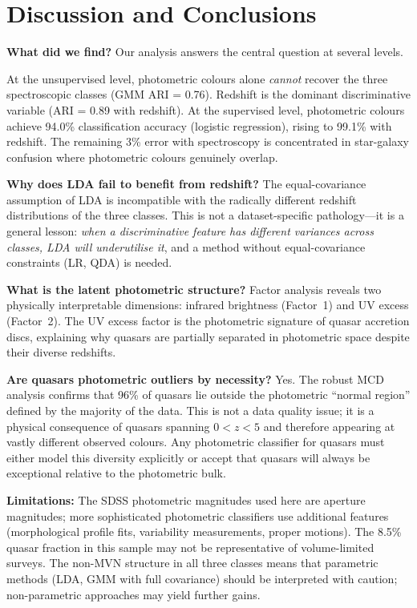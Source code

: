 \documentclass[12pt]{article}
\begin{document}
\section{Discussion and Conclusions}

\textbf{What did we find?} Our analysis answers the central question at several levels.

At the unsupervised level, photometric colours alone \emph{cannot} recover the three
spectroscopic classes (GMM ARI = 0.76). Redshift is the dominant discriminative variable
(ARI = 0.89 with redshift). At the supervised level, photometric colours achieve 94.0\%
classification accuracy (logistic regression), rising to 99.1\% with redshift. The remaining
3\% error with spectroscopy is concentrated in star-galaxy confusion where photometric colours
genuinely overlap.

\textbf{Why does LDA fail to benefit from redshift?} The equal-covariance assumption of LDA
is incompatible with the radically different redshift distributions of the three classes. This is
not a dataset-specific pathology---it is a general lesson: \emph{when a discriminative feature
has different variances across classes, LDA will underutilise it}, and a method without
equal-covariance constraints (LR, QDA) is needed.

\textbf{What is the latent photometric structure?} Factor analysis reveals two physically
interpretable dimensions: infrared brightness (Factor~1) and UV excess (Factor~2). The UV
excess factor is the photometric signature of quasar accretion discs, explaining why quasars
are partially separated in photometric space despite their diverse redshifts.

\textbf{Are quasars photometric outliers by necessity?} Yes. The robust MCD analysis confirms
that 96\% of quasars lie outside the photometric ``normal region'' defined by the
majority of the data. This is not a data quality issue; it is a physical consequence of quasars
spanning $0 < z < 5$ and therefore appearing at vastly different observed colours. Any
photometric classifier for quasars must either model this diversity explicitly or accept that
quasars will always be exceptional relative to the photometric bulk.

\textbf{Limitations:} The SDSS photometric magnitudes used here are aperture magnitudes;
more sophisticated photometric classifiers use additional features (morphological profile fits,
variability measurements, proper motions). The 8.5\% quasar fraction in this sample may
not be representative of volume-limited surveys. The non-MVN structure in all three classes
means that parametric methods (LDA, GMM with full covariance) should be interpreted with
caution; non-parametric approaches may yield further gains.
\end{document}
